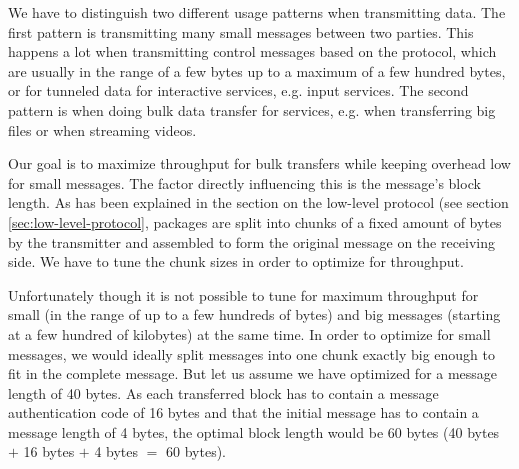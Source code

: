 \medskip

We have to distinguish two different usage patterns when transmitting data.
The first pattern is transmitting many small messages between two parties.
This happens a lot when transmitting control messages based on the protocol, which are usually in the range of a few bytes up to a maximum of a few hundred bytes, or for tunneled data for interactive services, e.g. input services.
The second pattern is when doing bulk data transfer for services, e.g. when transferring big files or when streaming videos.

Our goal is to maximize throughput for bulk transfers while keeping overhead low for small messages.
The factor directly influencing this is the message's block length.
As has been explained in the section on the low-level protocol (see section \ref{sec:low-level-protocol}, packages are split into chunks of a fixed amount of bytes by the transmitter and assembled to form the original message on the receiving side.
We have to tune the chunk sizes in order to optimize for throughput.

Unfortunately though it is not possible to tune for maximum throughput for small (in the range of up to a few hundreds of bytes) and big messages (starting at a few hundred of kilobytes) at the same time.
In order to optimize for small messages, we would ideally split messages into one chunk exactly big enough to fit in the complete message.
But let us assume we have optimized for a message length of 40 bytes.
As each transferred block has to contain a message authentication code of 16 bytes and that the initial message has to contain a message length of 4 bytes, the optimal block length would be 60 bytes (40 bytes $+$ 16 bytes $+$ 4 bytes $=$ 60 bytes).

